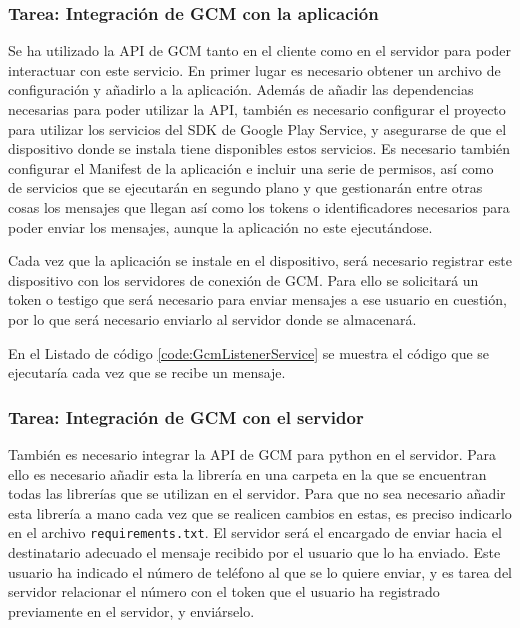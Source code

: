 \subsubsection{Tarea: Integración de \ac{GCM} con la aplicación}

Se ha utilizado la \ac{API} de \ac{GCM} tanto en el cliente como en el servidor para poder interactuar con este servicio. En primer lugar es necesario obtener un archivo de configuración y añadirlo a la aplicación. Además de añadir las dependencias necesarias para poder utilizar la \ac{API}, también es necesario configurar el proyecto para utilizar los servicios del \acs{SDK} de Google Play Service, y asegurarse de que el dispositivo donde se instala tiene disponibles estos servicios. Es necesario también configurar el Manifest de la aplicación e incluir una serie de permisos, así como de servicios que se ejecutarán en segundo plano y que gestionarán entre otras cosas los mensajes que llegan así como los tokens o identificadores necesarios para poder enviar los mensajes, aunque la aplicación no este ejecutándose.

Cada vez que la aplicación se instale en el dispositivo, será necesario registrar este dispositivo con los servidores de conexión de \ac{GCM}. Para ello se solicitará un token o testigo que será necesario para enviar mensajes a ese usuario en cuestión, por lo que será necesario enviarlo al servidor donde se almacenará.

En el Listado de código \ref{code:GcmListenerService} se muestra el código que se ejecutaría cada vez que se recibe un mensaje.\\



\subsubsection{Tarea: Integración de \ac{GCM} con el servidor}

También es necesario integrar la \ac{API} de \ac{GCM} para python en el servidor. Para ello es necesario añadir esta la librería en una carpeta en la que se encuentran todas las librerías que se utilizan en el servidor. Para que no sea necesario añadir esta librería a mano cada vez que se realicen cambios en estas, es preciso indicarlo en el archivo \texttt{requirements.txt}. El servidor será el encargado de enviar hacia el destinatario adecuado el mensaje recibido por el usuario que lo ha enviado. Este usuario ha indicado el número de teléfono al que se lo quiere enviar, y es tarea del servidor relacionar el número con el token que el usuario ha registrado previamente en el servidor, y enviárselo.

